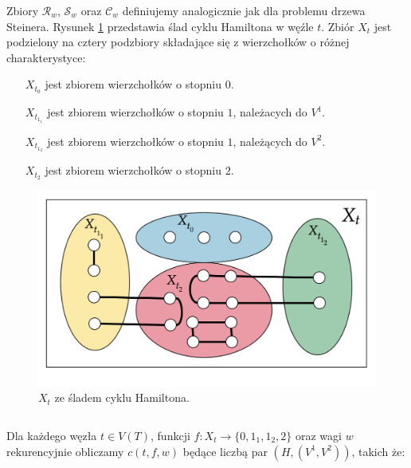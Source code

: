 \documentclass[12pt, oneside]{report}
\begin{document}
Zbiory $\mathcal{R}_w$, $\mathcal{S}_w$ oraz $\mathcal{C}_w$ definiujemy analogicznie jak dla problemu drzewa Steinera. Rysunek \ref{cnc_hamiltonian} przedstawia ślad cyklu Hamiltona w węźle $t$. Zbiór $X_t$ jest podzielony na cztery podzbiory składające się z wierzchołków o różnej charakterystyce:
\addtolength{\leftmargini}{3cm}
\begin{itemize}[noitemsep,topsep=5pt,parsep=0pt,partopsep=0pt]
\item[$X_{t_0}$ ] jest zbiorem wierzchołków o stopniu $0$.
\item[$X_{t_{1_1}}$] jest zbiorem wierzchołków o stopniu $1$, należacych do $V^1$.
\item[$X_{t_{1_2}}$] jest zbiorem wierzchołków o stopniu $1$, należących do $V^2$.
\item[$X_{t_2}$ ] jest zbiorem wierzchołków o stopniu $2$.
\end{itemize}
\addtolength{\leftmargini}{-3cm}
\begin{figure}
\centering
\label{cnc_hamiltonian}
\includegraphics[width=16cm]{cnc_hamiltonian.png}
\caption{$X_t$ ze śladem cyklu Hamiltona.}
\end{figure}
$$$$

Dla każdego węzła $t \in V(T)$, funkcji $f: X_t \to \{0,1_1,1_2,2\}$ oraz wagi $w$ rekurencyjnie obliczamy $c(t,f,w)$ będące liczbą par $(H, (V^1, V^2))$, takich że:
\end{document}
